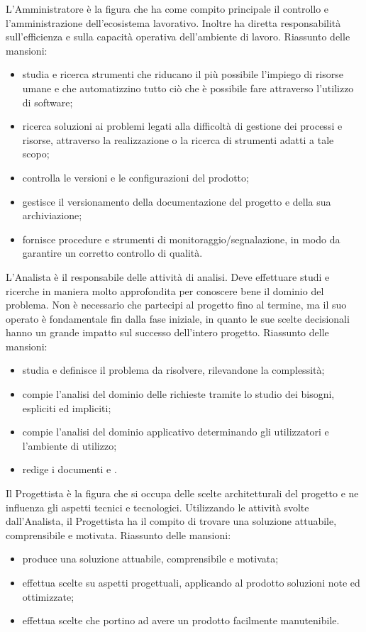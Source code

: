			L'Amministratore è la figura che ha come compito principale il controllo e l'amministrazione dell'ecosistema lavorativo. Inoltre ha diretta responsabilità sull'efficienza e sulla capacità operativa dell'ambiente di lavoro.
			Riassunto delle mansioni:
			\begin{itemize}
				\item studia e ricerca strumenti che riducano il più possibile l'impiego di risorse umane e che automatizzino tutto ciò che è possibile fare attraverso l'utilizzo di software;
				\item ricerca soluzioni ai problemi legati alla difficoltà di gestione dei processi e risorse, attraverso la realizzazione o la ricerca di strumenti adatti a tale scopo;
				\item controlla le versioni e le configurazioni del prodotto;
				\item gestisce il versionamento della documentazione del progetto e della sua archiviazione;
				\item fornisce procedure e strumenti di monitoraggio/segnalazione, in modo da garantire un corretto controllo di qualità.
			\end{itemize}
		
			L'Analista è il responsabile delle attività di analisi. Deve effettuare studi e ricerche in maniera molto approfondita per conoscere bene il dominio del problema. Non è necessario che partecipi al progetto fino al termine, ma il suo operato è fondamentale fin dalla fase iniziale, in quanto le sue scelte decisionali hanno un grande impatto sul successo dell'intero progetto.
			Riassunto delle mansioni:
			\begin{itemize}
				\item studia e definisce il problema da risolvere, rilevandone la complessità;
				\item compie l'analisi del dominio delle richieste tramite lo studio dei bisogni, espliciti ed impliciti;
				\item compie l'analisi del dominio applicativo determinando gli utilizzatori e l'ambiente di utilizzo;
				\item redige i documenti \AdR{} e \SdF{}.
			\end{itemize}
		
			Il Progettista è la figura che si occupa delle scelte architetturali del progetto e ne influenza gli aspetti tecnici e tecnologici. Utilizzando le attività svolte dall'Analista, il Progettista ha il compito di trovare una soluzione attuabile, comprensibile e motivata.
			Riassunto delle mansioni:
			\begin{itemize}
				\item produce una soluzione attuabile, comprensibile e motivata;
				\item effettua scelte su aspetti progettuali, applicando al prodotto soluzioni note ed ottimizzate;
				\item effettua scelte che portino ad avere un prodotto facilmente manutenibile.
			\end{itemize}
		
